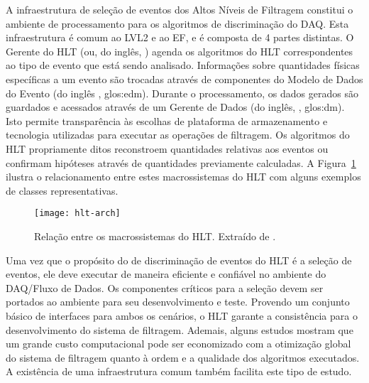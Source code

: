 A infraestrutura de seleção de eventos dos Altos Níveis de Filtragem constitui
o ambiente de processamento para os algoritmos de discriminação do DAQ. Esta
infraestrutura é comum ao LVL2 e ao EF, e é composta de 4 partes distintas. O
Gerente do HLT (ou, do inglês, ) agenda os algoritmos do HLT
correspondentes ao tipo de evento que está sendo analisado. Informações sobre
quantidades físicas específicas a um evento são trocadas através de
componentes do Modelo de Dados do Evento (do inglês ,
\gls{glos:edm}). Durante o processamento, os dados gerados são guardados e
acessados através de um Gerente de Dados (do inglês, ,
\gls{glos:dm}). Isto permite transparência às escolhas de plataforma de
armazenamento e tecnologia utilizadas para executar as operações de
filtragem. Os algoritmos do HLT propriamente ditos reconstroem quantidades
relativas aos eventos ou confirmam hipóteses através de quantidades
previamente calculadas. A Figura~\ref{fig:hlt-arch} ilustra o relacionamento
entre estes macrossistemas do HLT com alguns exemplos de classes
representativas.

\begin{figure}
\begin{center}
\texttt{[image: hlt-arch]}
\end{center}
\caption[Relação entre os macrossistemas do HLT.]{Relação entre os
macrossistemas do HLT. Extraído de \cite{hlt-tdr}.}
\label{fig:hlt-arch}
\end{figure}

Uma vez que o propósito do  de discriminação de eventos do HLT é
a seleção de eventos, ele deve executar de maneira eficiente e confiável no
ambiente do DAQ/Fluxo de Dados. Os componentes críticos para a seleção devem
ser portados ao ambiente  para seu desenvolvimento e
teste. Provendo um conjunto básico de interfaces para ambos os cenários, o HLT
garante a consistência para o desenvolvimento do sistema de
filtragem. Ademais, alguns estudos \cite{jb:e-gamma} mostram que um grande
custo computacional pode ser economizado com a otimização global do sistema de
filtragem quanto à ordem e a qualidade dos algoritmos executados. A existência
de uma infraestrutura comum também facilita este tipo de estudo.

